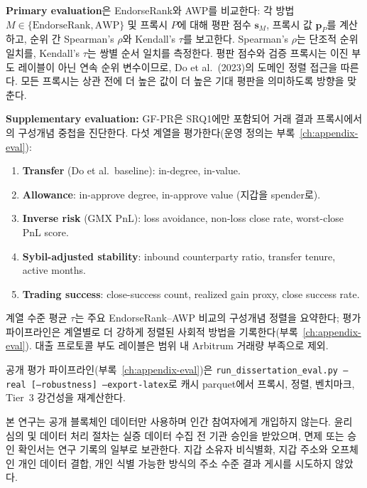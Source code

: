 
\textbf{Primary evaluation}은 EndorseRank와 AWP를 비교한다: 각 방법 $M \in \{\text{EndorseRank}, \text{AWP}\}$ 및 프록시 $P$에 대해 평판 점수 $\mathbf{s}_M$, 프록시 값 $\mathbf{p}_P$를 계산하고, 순위 간 Spearman's $\rho$와 Kendall's $\tau$를 보고한다. Spearman's $\rho$는 단조적 순위 일치를, Kendall's $\tau$는 쌍별 순서 일치를 측정한다. 평판 점수와 검증 프록시는 이진 부도 레이블이 아닌 연속 순위 변수이므로, Do et al.\ (2023)의 도메인 정렬 접근을 따른다. 모든 프록시는 상관 전에 더 높은 값이 더 높은 기대 평판을 의미하도록 방향을 맞춘다.

\textbf{Supplementary evaluation:} GF-PR은 SRQ1에만 포함되어 거래 결과 프록시에서의 구성개념 중첩을 진단한다. 다섯 계열을 평가한다(운영 정의는 부록~\ref{ch:appendix-eval}):

\begin{enumerate}
\item \textbf{Transfer} (Do et al.\ baseline): in-degree, in-value.
\item \textbf{Allowance}: in-approve degree, in-approve value (지갑을 spender로).
\item \textbf{Inverse risk} (GMX PnL): loss avoidance, non-loss close rate, worst-close PnL score.
\item \textbf{Sybil-adjusted stability}: inbound counterparty ratio, transfer tenure, active months.
\item \textbf{Trading success}: close-success count, realized gain proxy, close success rate.
\end{enumerate}

계열 수준 평균 $\tau$는 주요 EndorseRank--AWP 비교의 구성개념 정렬을 요약한다; 평가 파이프라인은 계열별로 더 강하게 정렬된 사회적 방법을 기록한다(부록~\ref{ch:appendix-eval}). 대출 프로토콜 부도 레이블은 범위 내 Arbitrum 거래량 부족으로 제외.


공개 평가 파이프라인(부록~\ref{ch:appendix-eval})은 \texttt{run\_dissertation\_eval.py --real [--robustness] --export-latex}로 캐시 parquet에서 프록시, 정렬, 벤치마크, Tier~3 강건성을 재계산한다.


본 연구는 공개 블록체인 데이터만 사용하며 인간 참여자에게 개입하지 않는다. 윤리 심의 및 데이터 처리 절차는 실증 데이터 수집 전 기관 승인을 받았으며, 면제 또는 승인 확인서는 연구 기록의 일부로 보관한다. 지갑 소유자 비식별화, 지갑 주소와 오프체인 개인 데이터 결합, 개인 식별 가능한 방식의 주소 수준 결과 게시를 시도하지 않았다.

